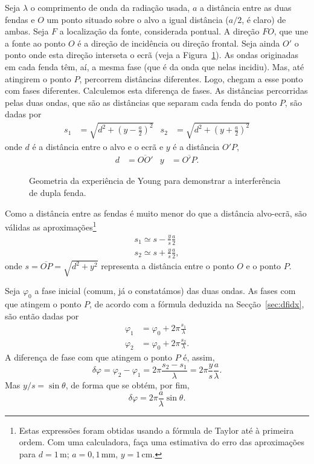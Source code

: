 Seja $\lambda$ o comprimento de onda da radiação usada, $a$ a distância entre
as duas fendas e $O$ um ponto situado sobre o alvo a igual distância ($a/2$, é
claro) de ambas. Seja $F$ a localização da fonte, considerada pontual. A direção
$FO$, que une a fonte ao ponto $O$ é a direção de incidência ou direção frontal.
Seja ainda $O'$ o ponto onde esta direção interseta o ecrã (veja a
Figura~\ref{fig:oof070}).  As ondas originadas em cada fenda têm, aí, a mesma
fase (que é da onda que nelas incidiu). Mas, até atingirem o ponto $P$,
percorrem distâncias diferentes. Logo, chegam a esse ponto com fases diferentes.
Calculemos esta diferença de fases. As distâncias percorridas pelas duas ondas,
que são as distâncias que separam cada fenda do ponto $P$, são dadas por
\begin{align*}
    s_1&=\sqrt{d^2+\left(y-\frac{a}{2}\right)^2}&
    s_2&=\sqrt{d^2+\left(y+\frac{a}{2}\right)^2}
\end{align*}
onde $d$ é a distância entre o alvo e o ecrã e $y$ é a distância $O'P$,
\begin{align*}
d&=\overline{OO'}&y&=\overline{O'P}.%
\end{align*}
\begin{figure}[htb]
    {\centering
        \caption{Geometria da experiência de Young para demonstrar a
        interferência de dupla fenda.\label{fig:oof070}}

    }
\end{figure}
Como a distância entre as fendas é muito menor do que a distância alvo-ecrã,
são válidas as aproximações\footnote{Estas expressões foram obtidas usando a
fórmula de Taylor até à primeira ordem. Com uma calculadora, faça uma estimativa
do erro das aproximações para $d=1$\,m; $a=0,1$\,mm, $y=1$\,cm.}
\begin{align*}
s_1\simeq s-\frac{y}{s}\frac{a}{2}\\
s_2\simeq s+\frac{y}{s}\frac{a}{2},
\end{align*}
onde $s=\overline{OP}=\sqrt{d^2+y^2}$ representa a distância entre o ponto $O$ e
o ponto $P$.

Seja $\varphi_0$ a fase inicial (comum, já o constatámos) das duas ondas. As
fases com que atingem o ponto $P$, de acordo com a fórmula deduzida na
Secção~\ref{sec:dfidx}, são então dadas por
\begin{align*}
\varphi_1 &= \varphi_0+2\pi\frac{s_1}{\lambda}\\
\varphi_2 &= \varphi_0+2\pi\frac{s_2}{\lambda}.
\end{align*}
A diferença de fase com que atingem o ponto $P$ é, assim,
\begin{equation*}
\delta\varphi = \varphi_2-\varphi_1 =2\pi\frac{s_2-s_1}{\lambda}=
2\pi\frac{y}{s}\frac{a}{\lambda}.
\end{equation*}
Mas $y/s=\sin\theta$, de forma que se obtém, por fim,
\begin{equation*}
\delta\varphi = 2\pi\frac{a}{\lambda}\sin\theta.
\end{equation*}

